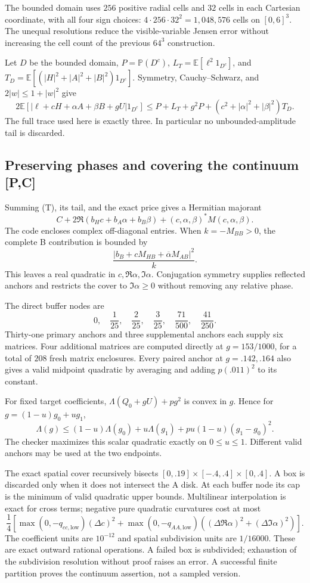 The bounded domain uses $256$ positive radial cells and $32$ cells
in each Cartesian coordinate, with all four sign choices:
$4\cdot256\cdot32^2=1,048,576$ cells on $[0,6]^3$.
The unequal resolutions reduce the visible-variable Jensen error
without increasing the cell count of the previous $64^3$ construction.

Let $D$ be the bounded domain, $P=\mathbb P(D^c)$,
$L_T=\mathbb E[\ell^2 1_{D^c}]$, and
$T_D=\mathbb E[(|H|^2+|A|^2+|B|^2)1_{D^c}]$.
Symmetry, Cauchy--Schwarz, and $2|w|\le1+|w|^2$ give
\[
 2\mathbb E[|\ell+cH+\alpha A+\beta B+gU|1_{D^c}]
 \le P+L_T+g^2P+(c^2+|\alpha|^2+|\beta|^2)T_D.
\]
The full trace used here is exactly three. In particular no
unbounded-amplitude tail is discarded.

\subsection{Preserving phases and covering the continuum [P,C]}
Summing (T), its tail, and the exact price gives a Hermitian majorant
\[
 C+2\Re(b_Hc+b_A\alpha+b_B\beta)
 +(c,\alpha,\beta)^*M(c,\alpha,\beta).
\]
The code encloses complex off-diagonal entries. When
$k=-M_{BB}>0$, the complete B contribution is bounded by
\[
 \frac{|b_B+cM_{HB}+\overline\alpha M_{AB}|^2}{k}.
 \tag{Schur}
\]
This leaves a real quadratic in $c,\Re\alpha,\Im\alpha$.
Conjugation symmetry supplies reflected anchors and restricts the
cover to $\Im\alpha\ge0$ without removing any relative phase.

The direct buffer nodes are
\[
 0,\quad \frac1{25},\quad\frac2{25},\quad\frac3{25},
 \quad\frac{71}{500},\quad\frac{41}{250}.
\]
Thirty-one primary anchors and three supplemental anchors each
supply six matrices. Four additional matrices are computed directly
at $g=153/1000$, for a total of $208$ fresh matrix enclosures.
Every paired anchor at $g=.142,.164$ also gives a valid midpoint
quadratic by averaging and adding $p(.011)^2$ to its constant.

For fixed target coefficients, $\Lambda(Q_0+gU)+pg^2$ is convex in
$g$. Hence for $g=(1-u)g_0+ug_1$,
\[
 \Lambda(g)\le(1-u)\Lambda(g_0)+u\Lambda(g_1)
                    +pu(1-u)(g_1-g_0)^2.
 \tag{I}
\]
The checker maximizes this scalar quadratic exactly on $0\le u\le1$.
Different valid anchors may be used at the two endpoints.

The exact spatial cover recursively bisects
$[0,.19]\times[-.4,.4]\times[0,.4]$.
A box is discarded only when it does not intersect the A disk.
At each buffer node its cap is the minimum of valid quadratic
upper bounds. Multilinear interpolation is exact for cross terms;
negative pure quadratic curvatures cost at most
\[
 \frac14\left[
 \max(0,-q_{cc,\mathrm{low}})(\Delta c)^2+
 \max(0,-q_{AA,\mathrm{low}})
    ((\Delta\Re\alpha)^2+(\Delta\Im\alpha)^2)\right].
\]
The coefficient units are $10^{-12}$ and spatial subdivision units
are $1/16000$. These are exact outward rational operations.
A failed box is subdivided; exhaustion of the subdivision resolution
without proof raises an error. A successful finite partition proves
the continuum assertion, not a sampled version.


